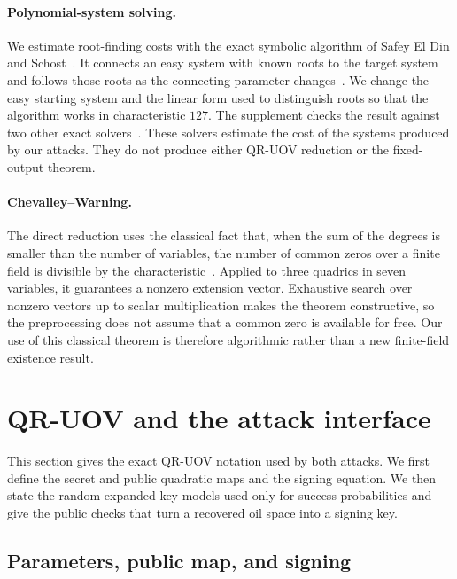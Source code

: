 \documentclass[11pt,a4paper]{article}
\theoremstyle{definition}
\theoremstyle{remark}
\begin{document}
\paragraph{Polynomial-system solving.}
We estimate root-finding costs with the exact symbolic algorithm of Safey El
Din and Schost~\cite{SafeySchost2018}.  It connects an easy system with known
roots to the target system and follows those roots as the connecting parameter
changes~\cite{GiustiLecerfSalvy2001,Schost2003}.  We change the easy starting
system and the linear form used to distinguish roots so that the algorithm
works in characteristic $127$.  The supplement checks the result against two
other exact solvers~\cite{vdHL,Gimenez2026}.  These solvers estimate the cost
of the systems produced by our attacks.  They do not produce either QR-UOV
reduction or the fixed-output theorem.

\paragraph{Chevalley--Warning.}
The direct reduction uses the classical fact that, when the sum of the degrees
is smaller than the number of variables, the number of common zeros over a
finite field is divisible by the characteristic~\cite{Chevalley1935,Warning1935}.
Applied to three quadrics in seven variables, it guarantees a nonzero extension
vector.  Exhaustive search over nonzero vectors up to scalar multiplication
makes the theorem constructive, so the preprocessing does not assume that a
common zero is available for free.  Our use of this classical theorem is
therefore algorithmic rather than a new finite-field existence result.

\section{QR-UOV and the attack interface}\label{sec:model}

This section gives the exact QR-UOV notation used by both attacks.  We first
define the secret and public quadratic maps and the signing equation.  We then
state the random expanded-key models used only for success probabilities and
give the public checks that turn a recovered oil space into a signing key.

\subsection{Parameters, public map, and signing}
\end{document}
